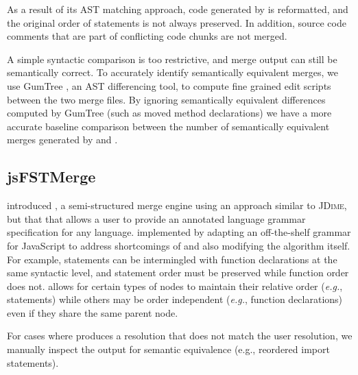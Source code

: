 As a result of its AST matching approach, code generated by \jdime{} is reformatted, and the original order of statements is not always preserved. In addition, source code comments that are part of conflicting code chunks are not merged. 

A simple syntactic comparison is too restrictive, and \jdime{} merge output can still be semantically correct. To accurately identify semantically equivalent merges, we use GumTree \cite{FalleriMBMM14}, an AST differencing tool, to compute fine grained edit scripts between the two merge files. By ignoring semantically equivalent differences computed by GumTree (such as moved method declarations) we have a more accurate baseline comparison between the number of semantically equivalent merges generated by \jdime{} and \thistool{}.

\subsection{jsFSTMerge}
\citet{apel2012fstmerge} introduced \fstmerge{}, a semi-structured merge engine using an approach similar to \textsc{JDime}, but that that allows a user to provide an annotated language grammar specification for any language. 
\citet{tavares2019javascript} implemented \jsfstmerge{} by adapting an off-the-shelf grammar for JavaScript to address shortcomings of \fstmerge{} and also modifying the \fstmerge{} algorithm itself.  
For example, statements can be intermingled with function declarations at the same syntactic level, and statement order must be preserved while function order does not.  
\jsfstmerge{} allows for certain types of nodes to maintain their relative order (\emph{e.g.}, statements) while others may be order independent (\emph{e.g.}, function declarations) even if they share the same parent node.

For cases where \jsfstmerge{} produces a resolution that does not match the user resolution, we manually inspect the output for semantic equivalence (e.g., reordered import statements).

